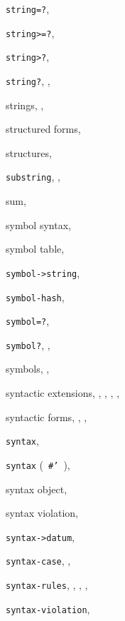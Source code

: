 {\begin{multicols}{2}
\texttt{string=?}, \textit{\pageref{objects_s215}}
  
\texttt{string\textgreater{}=?}, \textit{\pageref{objects_s215}}
  
\texttt{string\textgreater{}?}, \textit{\pageref{objects_s215}}
  
\texttt{string?}, \pageref{start_s121}, \textit{\pageref{objects_s20}}
  
strings, \pageref{start_s1}, \pageref{objects_s212}
  
structured forms, \pageref{intro_s29}
  
structures, \pageref{syntax_s69}
  
\texttt{substring}, \pageref{binding_s15}, \textit{\pageref{objects_s224}}
  
sum, \pageref{further_s34}
  
symbol syntax, \pageref{grammar_s17}
  
symbol table, \pageref{objects_s267}
  
\texttt{symbol-\textgreater{}string}, \textit{\pageref{objects_s270}}
  
\texttt{symbol-hash}, \textit{\pageref{objects_s279}}
  
\texttt{symbol=?}, \textit{\pageref{objects_s268}}
  
\texttt{symbol?}, \pageref{start_s119}, \textit{\pageref{objects_s22}}
  
symbols, \pageref{start_s19}, \pageref{objects_s266}
  
syntactic extensions, \pageref{intro_s25}, \pageref{start_s46}, \pageref{further_s2}, \pageref{further_s12}, \pageref{syntax_s0}
  
syntactic forms, \pageref{start_s17}, \pageref{further_s1}, \pageref{syntax_s1}
  
\texttt{syntax}, \pageref{syntax_s8}
  
\texttt{syntax} ( \texttt{\#{}'} ), \textit{\pageref{syntax_s33}}
  
syntax object, \pageref{syntax_s29}
  
syntax violation, \pageref{intro_s56}
  
\texttt{syntax-\textgreater{}datum}, \textit{\pageref{syntax_s44}}
  
\texttt{syntax-case}, \pageref{syntax_s7}, \textit{\pageref{syntax_s30}}
  
\texttt{syntax-rules}, \pageref{syntax_s6}, \textit{\pageref{syntax_s14}}, \pageref{syntax_s34}, \pageref{examples_s18}
  
\texttt{syntax-violation}, \textit{\pageref{exceptions_s6}}
  

\end{multicols}}
